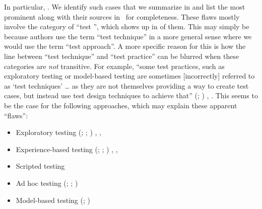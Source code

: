 \label{multiCats}
\ifnotpaper
    \begin{table}
        \vspace{-0.75cm}
        
        \vspace{-1cm}
    \end{table}
\fi
In particular, \multiCatIntro{}. We identify \multiCatCount{} such cases
\ifnotpaper that we summarize in  \fi and list
\ifnotpaper \else the most prominent \fi along with their sources in
\ifnotpaper\ for completeness\fi.
These flaws mostly involve the category of ``test \multiCatMax{}'', which
shows up in \multiCatMaxCount{} of them. This may simply be because authors use
the term ``test technique'' in a more general sense where we would use the term
``test approach''.\label{cats-intrans} A more
specific reason for this is how the line between ``test technique'' and
``test practice'' can be blurred when these categories are \emph{not}
transitive. For example, ``some test practices, such as exploratory testing or
model-based testing are sometimes [incorrectly] referred to as `test techniques'
\dots{} as they are not themselves providing a way to create test cases, but
instead use test design techniques to achieve that'' \ifnotpaper
    (\citealp[p.~11]{IEEE2022}; \citeyear[p.~5]{IEEE2021a})\else
    \cite[p.~11]{IEEE2022}, \cite[p.~5]{IEEE2021a}\fi. This seems to be the
case for the following approaches, which may explain these apparent ``flaws'':
\begin{itemize}
    \item Exploratory testing \ifnotpaper (\citeyear[p.~33]{IEEE2022};
              \citeyear[p.~viii]{IEEE2021c}; \citeyear[p.~13]{IEEE2013}) \else
              \cite[p.~33]{IEEE2022}, \cite[p.~viii]{IEEE2021c},
              \cite[p.~13]{IEEE2013} \fi
    \item Experience-based testing \ifnotpaper (\citeyear[p.~4]{IEEE2022};
              \citeyear[pp.~viii, 4]{IEEE2021c}; \citeyear[p.~33]{IEEE2013})
          \else \cite[p.~4]{IEEE2022}, \cite[pp.~viii, 4]{IEEE2021c},
              \cite[p.~33]{IEEE2013} \fi
    \item Scripted testing \citeyearpar[p.~33]{IEEE2022} \ifnotpaper
    \item Ad hoc testing (\citealp[p.~5\=/14]{SWEBOK2024}; \citealpISTQB{};
          \citealp[p.~42]{Kam2008})
    \item Model-based testing (\citealp[pp.~1\==2]{EngströmAndPetersen2015};
          \citealp[p.~4]{Kam2008}) \fi
\end{itemize}

